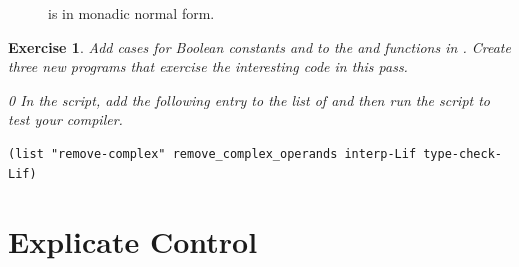 \documentclass[7x10,nocrop]{TimesAPriori_MIT}%
\newcommand{\gray}[1]{{\color{gray} #1}}
\def\racketEd{0}
\def\pythonEd{1}
\def\edition{0}
\newtheorem{exercise}[theorem]{Exercise}
\begin{document}
\begin{figure}[tp]
\centering
\fbox{
\begin{minipage}{0.96\textwidth}
{\if\edition\racketEd    
\[
\begin{array}{rcl}
Atm &::=& \gray{ \INT{\Int} \MID \VAR{\Var} } \MID \BOOL{\itm{bool}}\\
\Exp &::=& \gray{ \Atm \MID \READ{} } \\
     &\MID& \gray{ \NEG{\Atm} \MID \ADD{\Atm}{\Atm} } \\
     &\MID& \gray{ \LET{\Var}{\Exp}{\Exp} } \\
     &\MID& \UNIOP{\key{not}}{\Atm} \\
      &\MID& \BINOP{\itm{cmp}}{\Atm}{\Atm} \MID \IF{\Exp}{\Exp}{\Exp} \\
\LangIfANF  &::=& \PROGRAM{\code{()}}{\Exp}
\end{array}
\]
\fi}
{\if\edition\pythonEd
\[
\begin{array}{l}
  \gray{\LvarMonadASTPython} \\ \hline
  \LifMonadASTPython \\
   \begin{array}{rcl}
     \LangIfANF  &::=& \PROGRAM{\code{()}}{\Stmt^{*}}
   \end{array}
\end{array}
\]
\fi}
\end{minipage}
}
\caption{\LangIfANF{} is \LangIf{} in monadic normal form.}
\label{fig:Lif-anf-syntax}
\end{figure}


\begin{exercise}\normalfont\normalsize
%
Add cases for Boolean constants and  to the 
and  functions in .
%
Create three new \LangIf{} programs that exercise the interesting
code in this pass.
%
{\if\edition\racketEd    
In the  script, add the following entry to the
list of  and then run the script to test your compiler.
\begin{lstlisting}
(list "remove-complex" remove_complex_operands interp-Lif type-check-Lif)
\end{lstlisting}
\fi}
\end{exercise}


\section{Explicate Control}
\label{sec:explicate-control-Lif}
\end{document}
